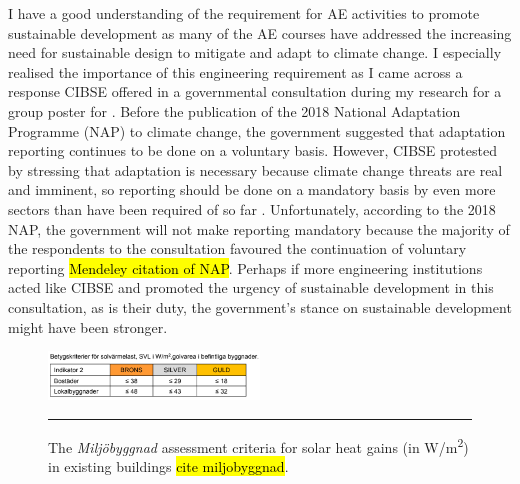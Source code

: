 I have a good understanding of the requirement for AE activities to promote sustainable development as many of the AE courses have addressed the increasing need for sustainable design to mitigate and adapt to climate change.
I especially realised the importance of this engineering requirement as I came across a response CIBSE offered in a governmental consultation during my research for a group poster for \CCSATitle.
Before the publication of the 2018 National Adaptation Programme (NAP) to climate change, 
the government suggested that adaptation reporting continues to be done on a voluntary basis.
However, CIBSE protested by stressing that adaptation is necessary because climate change threats are real and imminent, so reporting should be done on a mandatory basis by even more sectors than have been required of so far \citep{CIBSE:CCAreporting}.
Unfortunately, according to the 2018 NAP, the government will not make reporting mandatory because the majority of the respondents to the consultation favoured the continuation of voluntary reporting \hl{Mendeley citation of NAP}.
Perhaps if more engineering institutions acted like CIBSE and promoted the urgency of sustainable development in this consultation, as is their duty, the government's stance on sustainable development might have been stronger.

\begin{figure}
	\centering
	\includegraphics[width=0.5\textwidth]{figures/SVL.PNG}
	\rule{0.5\textwidth}{0.5pt} %
	\caption[The \textit{Miljöbyggnad} assessment criteria for solar heat gains in existing buildings.]{The \textit{Miljöbyggnad} assessment criteria for solar heat gains (in W/m\textsuperscript{2}) in existing buildings \hl{cite miljobyggnad}.}
	\label{fig:svl}
\end{figure}

